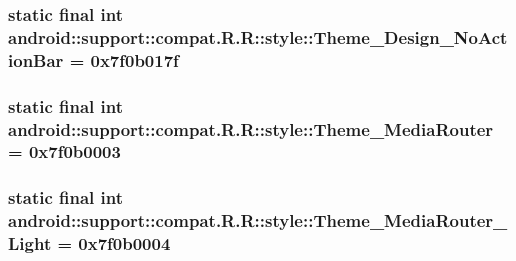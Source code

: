 \hypertarget{classandroid_1_1support_1_1compat_1_1_r_1_1style_06ac793cddcf0d3e0848444d1ca5699e}{
\subsubsection[{Theme\_\-Design\_\-NoActionBar}]{\setlength{\rightskip}{0pt plus 5cm}static final int android::support::compat.R.R::style::Theme\_\-Design\_\-NoActionBar = 0x7f0b017f}}
\label{classandroid_1_1support_1_1compat_1_1_r_1_1style_06ac793cddcf0d3e0848444d1ca5699e}


\hypertarget{classandroid_1_1support_1_1compat_1_1_r_1_1style_56fbf054490159e8adab7bfae6f23109}{
\subsubsection[{Theme\_\-MediaRouter}]{\setlength{\rightskip}{0pt plus 5cm}static final int android::support::compat.R.R::style::Theme\_\-MediaRouter = 0x7f0b0003}}
\label{classandroid_1_1support_1_1compat_1_1_r_1_1style_56fbf054490159e8adab7bfae6f23109}


\hypertarget{classandroid_1_1support_1_1compat_1_1_r_1_1style_8380eb55109d4b4e028b88956cf12f7d}{
\subsubsection[{Theme\_\-MediaRouter\_\-Light}]{\setlength{\rightskip}{0pt plus 5cm}static final int android::support::compat.R.R::style::Theme\_\-MediaRouter\_\-Light = 0x7f0b0004}}
\label{classandroid_1_1support_1_1compat_1_1_r_1_1style_8380eb55109d4b4e028b88956cf12f7d}


